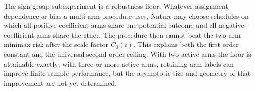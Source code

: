 The sign-group subexperiment is a robustness floor.  Whatever assignment dependence or bias a multi-arm procedure uses, Nature may choose schedules on which all positive-coefficient arms share one potential outcome and all negative-coefficient arms share the other.  The procedure then cannot beat the two-arm minimax risk after the scale factor \(C_0(c)\).  This explains both the first-order constant and the universal second-order ceiling.  With two active arms the floor is attainable exactly; with three or more active arms, retaining arm labels can improve finite-sample performance, but the asymptotic size and geometry of that improvement are not yet determined.